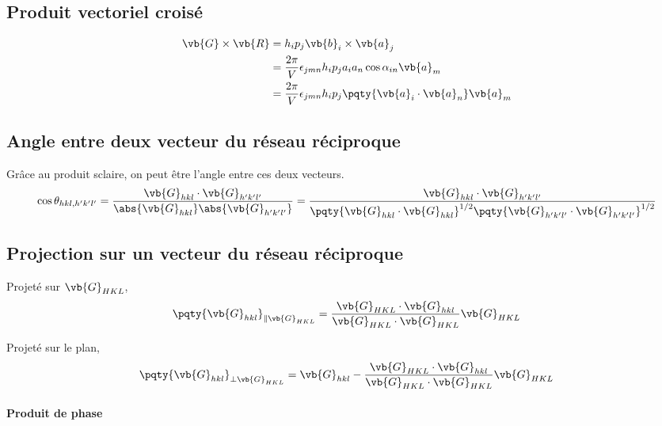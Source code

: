 \subsection{Produit vectoriel croisé}
\begin{align*}
	\vb{G} \times \vb{R} &= h_i p_j \vb{b}_i \times \vb{a}_j \\
	&= \frac{2\pi}{V} \epsilon_{jmn} h_i p_j  a_ia_n\cos\alpha_{in}\vb{a}_m \\
	&= \frac{2\pi}{V} \epsilon_{jmn} h_i p_j  \pqty{\vb{a}_i \cdot \vb{a}_n}\vb{a}_m
\end{align*}


\subsection{Angle entre deux vecteur du réseau réciproque} %
\label{sub:angle_entre_deux_vecteur_du_réseau_réciproque}

Grâce au produit sclaire, on peut être l'angle entre ces deux vecteurs.
\begin{align*}
	\cos\theta_{hkl,h^\prime k^\prime l^\prime} = \frac{\vb{G}_{hkl} \cdot \vb{G}_{h^\prime k^\prime l^\prime}}{\abs{\vb{G}_{hkl}}  \abs{\vb{G}_{h^\prime k^\prime l^\prime}}} = \frac{\vb{G}_{hkl} \cdot \vb{G}_{h^\prime k^\prime l^\prime}}{\pqty{\vb{G}_{hkl} \cdot \vb{G}_{hkl}}^{1/2}\pqty{\vb{G}_{h^\prime k^\prime l^\prime} \cdot \vb{G}_{h^\prime k^\prime l^\prime}}^{1/2}} 
\end{align*}


\subsection{Projection sur un vecteur du réseau réciproque} 

Projeté sur $\vb{G}_{HKL}$,
\begin{align*}
	\pqty{\vb{G}_{hkl}}_{\parallel\vb{G}_{HKL}} = \frac{\vb{G}_{HKL} \cdot \vb{G}_{hkl}}{\vb{G}_{HKL} \cdot \vb{G}_{HKL} }\vb{G}_{HKL} 
\end{align*}

Projeté sur le plan,
\begin{align*}
	\pqty{\vb{G}_{hkl}}_{\perp\vb{G}_{HKL}} = \vb{G}_{hkl} - \frac{\vb{G}_{HKL} \cdot \vb{G}_{hkl}}{\vb{G}_{HKL} \cdot \vb{G}_{HKL} }\vb{G}_{HKL} 
\end{align*}

\paragraph{Produit de phase} %
\label{par:produit_de_phase}

